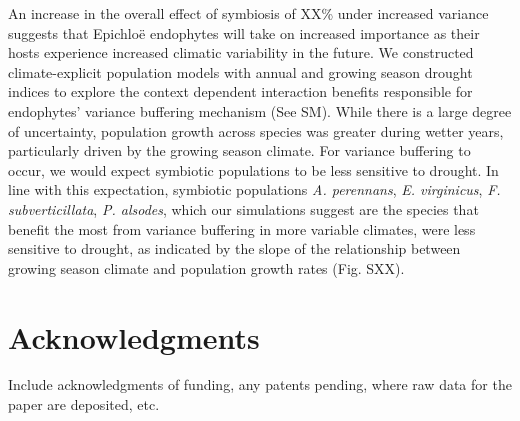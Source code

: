 \documentclass[12pt]{article}
\begin{document}
An increase in the overall effect of symbiosis of XX\% under increased variance suggests that Epichlo\"{e} endophytes will take on increased importance as their hosts experience increased climatic variability in the future. 
We constructed climate-explicit population models with annual and growing season drought indices to explore the context dependent interaction benefits responsible for endophytes' variance buffering mechanism (See SM).
While there is a large degree of uncertainty, population growth across species was greater during wetter years, particularly driven by the growing season climate. 
For variance buffering to occur, we would expect symbiotic populations to be less sensitive to drought. 
In line with this expectation, symbiotic populations \emph{A. perennans}, \emph{E. virginicus}, \emph{F. subverticillata}, \emph{P. alsodes}, which our simulations suggest are the species that benefit the most from variance buffering in more variable climates, were less sensitive to drought, as indicated by the slope of the relationship between growing season climate and population growth rates (Fig. SXX).















\section*{Acknowledgments}
Include acknowledgments of funding, any patents pending, where raw data for the paper are deposited, etc.

\end{document}

